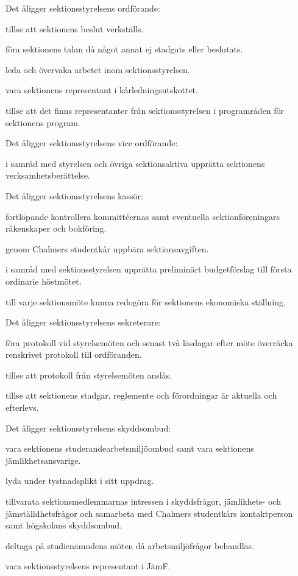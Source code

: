 \documentclass{styrdokument}
\begin{document}
\? Det åligger sektionsstyrelsens ordförande:
\begin{aligganden}
    \item tillse att sektionens beslut verkställs.
    \item föra sektionens talan då något annat ej stadgats eller beslutats.
    \item leda och övervaka arbetet inom sektionsstyrelsen.
    \item vara sektionens representant i kårledningsutskottet.
    \item tillse att det finns representanter från sektionsstyrelsen i programråden för sektionens program.
\end{aligganden}

\? Det åligger sektionsstyrelsens vice ordförande:
\begin{aligganden}
    \item i samråd med styrelsen och övriga sektionsaktiva upprätta sektionens verksamhetsberättelse.
\end{aligganden}

\? Det åligger sektionsstyrelsens  kassör:
\begin{aligganden}
    \item fortlöpande kontrollera kommittéernas samt eventuella sektionföreningars räkenskaper och bokföring.
    \item genom Chalmers studentkår uppbära sektionsavgiften.
    \item i samråd med sektionsstyrelsen upprätta preliminärt budgetförslag till första ordinarie höstmötet.
    \item till varje sektionsmöte kunna redogöra för sektionens ekonomiska ställning.
\end{aligganden}

\? Det åligger sektionsstyrelsens sekreterare:
\begin{aligganden}
    \item föra protokoll vid styrelsemöten och senast två läsdagar efter möte överräcka renskrivet protokoll till ordföranden.
    \item tillse att protokoll från styrelsemöten anslås.
    \item tillse att sektionens stadgar, reglemente och förordningar är aktuella och efterlevs.
\end{aligganden}

\? Det åligger sektionsstyrelsens skyddsombud:
\begin{aligganden}
    \item vara sektionens studerandearbetsmiljöombud samt vara sektionens jämlikhetsansvarige.
    \item lyda under tystnadsplikt i sitt uppdrag.
    \item tillvarata sektionsmedlemmarnas intressen i skyddsfrågor, jämlikhets- och jämställdhetsfrågor och samarbeta med Chalmers studentkårs kontaktperson samt högskolans skyddsombud.
    \item deltaga på studienämndens möten då arbetsmiljöfrågor behandlas.
    \item vara sektionsstyrelsens representant i JämF.
\end{aligganden}
\end{document}
